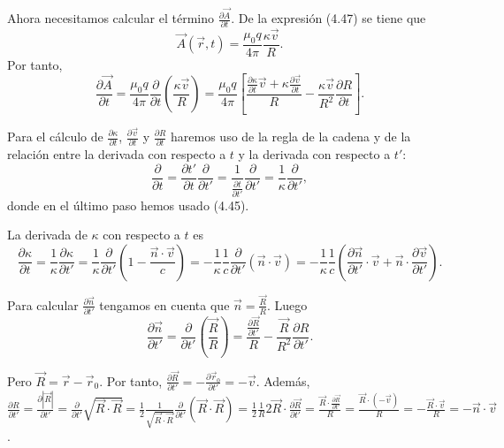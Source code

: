 \documentclass[12pt,a4paper]{book}
\begin{document}
Ahora necesitamos calcular el término $\frac{\partial\vec{A}}{\partial t}$. De la expresión (4.47) se tiene que
\begin{equation}
\vec{A}(\vec{r}, t) = \frac{\mu_0 q}{4\pi}\frac{\kappa\vec{v}}{R}.
\end{equation}
Por tanto,
\begin{equation}
\frac{\partial\vec{A}}{\partial t} = \frac{\mu_0 q}{4\pi}\frac{\partial}{\partial t}\left(\frac{\kappa\vec{v}}{R}\right) = \frac{\mu_0 q}{4\pi}\left[\frac{\frac{\partial\kappa}{\partial t}\vec{v} + \kappa\frac{\partial\vec{v}}{\partial t}}{R} - \frac{\kappa\vec{v}}{R^2}\frac{\partial R}{\partial t}\right].
\end{equation}

Para el cálculo de $\frac{\partial\kappa}{\partial t}$, $\frac{\partial\vec{v}}{\partial t}$ y $\frac{\partial R}{\partial t}$ haremos uso de la regla de la cadena y de la relación entre la derivada con respecto a $t$ y la derivada con respecto a $t'$:
\begin{equation}
\frac{\partial}{\partial t} = \frac{\partial t'}{\partial t}\frac{\partial}{\partial t'} = \frac{1}{\frac{\partial t}{\partial t'}}\frac{\partial}{\partial t'} = \frac{1}{\kappa}\frac{\partial}{\partial t'},
\end{equation}
donde en el último paso hemos usado (4.45).

La derivada de $\kappa$ con respecto a $t$ es
\begin{equation}
\frac{\partial\kappa}{\partial t} = \frac{1}{\kappa}\frac{\partial\kappa}{\partial t'} = \frac{1}{\kappa}\frac{\partial}{\partial t'}\left(1 - \frac{\vec{n} \cdot \vec{v}}{c}\right) = -\frac{1}{\kappa}\frac{1}{c}\frac{\partial}{\partial t'}(\vec{n} \cdot \vec{v}) = -\frac{1}{\kappa}\frac{1}{c}\left(\frac{\partial\vec{n}}{\partial t'} \cdot \vec{v} + \vec{n} \cdot \frac{\partial\vec{v}}{\partial t'}\right).
\end{equation}

Para calcular $\frac{\partial\vec{n}}{\partial t'}$ tengamos en cuenta que $\vec{n} = \frac{\vec{R}}{R}$. Luego
\begin{equation}
\frac{\partial\vec{n}}{\partial t'} = \frac{\partial}{\partial t'}\left(\frac{\vec{R}}{R}\right) = \frac{\frac{\partial\vec{R}}{\partial t'}}{R} - \frac{\vec{R}}{R^2}\frac{\partial R}{\partial t'}.
\end{equation}

Pero $\vec{R} = \vec{r} - \vec{r}_0$. Por tanto, $\frac{\partial\vec{R}}{\partial t'} = -\frac{\partial\vec{r}_0}{\partial t'} = -\vec{v}$. Además, $\frac{\partial R}{\partial t'} = \frac{\partial|\vec{R}|}{\partial t'} = \frac{\partial}{\partial t'}\sqrt{\vec{R} \cdot \vec{R}} = \frac{1}{2}\frac{1}{\sqrt{\vec{R} \cdot \vec{R}}}\frac{\partial}{\partial t'}(\vec{R} \cdot \vec{R}) = \frac{1}{2}\frac{1}{R}2\vec{R} \cdot \frac{\partial\vec{R}}{\partial t'} = \frac{\vec{R} \cdot \frac{\partial\vec{R}}{\partial t'}}{R} = \frac{\vec{R} \cdot (-\vec{v})}{R} = -\frac{\vec{R} \cdot \vec{v}}{R} = -\vec{n} \cdot \vec{v}$.
\end{document}
